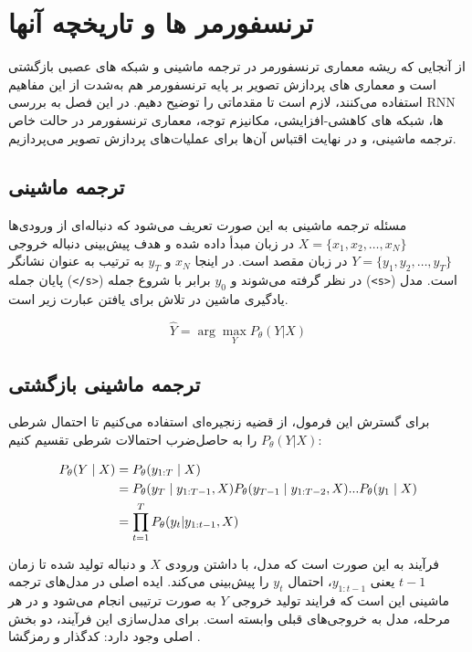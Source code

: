 \chapter{ترنسفورمر ها و تاریخچه آنها}

از آنجایی که ریشه معماری ترنسفورمر در ترجمه ماشینی و شبکه های عصبی بازگشتی است و معماری های پردازش تصویر بر پایه ترنسفورمر هم به‌شدت از این مفاهیم استفاده می‌کنند، لازم است تا مقدماتی را توضیح دهیم. در این فصل به بررسی RNN ها، شبکه های کاهشی-افزایشی، مکانیزم توجه، معماری ترنسفورمر در حالت خاص ترجمه ماشینی، و در نهایت اقتباس آن‌ها برای عملیات‌های پردازش تصویر می‌پردازیم.

\section{ ترجمه ماشینی}
مسئله ترجمه ماشینی به این صورت تعریف می‌شود که دنباله‌ای از ورودی‌ها $X = \{x_1, x_2, \dots, x_N\}$ در زبان مبدأ داده شده و هدف پیش‌بینی دنباله خروجی $Y = \{y_1, y_2, \dots, y_T\}$ در زبان مقصد است. در اینجا $x_N$ و $ y_T $ به ترتیب به عنوان نشانگر پایان جمله (\texttt{</s>}) در نظر گرفته می‌شوند و $ y_0 $
برابر با شروع جمله (\texttt{<s>}) است. مدل یادگیری ماشین در تلاش برای یافتن عبارت زیر است.

\begin{equation}
\hat{Y} = \arg\max_{Y} P_\theta(Y | X)
\end{equation}

\section{ ترجمه ماشینی بازگشتی}



برای گسترش این فرمول، از قضیه زنجیره‌ای استفاده می‌کنیم تا احتمال شرطی $P_\theta(Y|X)$ را به حاصل‌ضرب احتمالات شرطی تقسیم کنیم:

\begin{align}
	P_{\theta }(Y \mid X) & = P_{\theta }(y_{1:T} \mid X)  \notag \\
	& = P_{\theta }(y_{T} \mid y_{1:T-1}, X) 
	P_{\theta }(y_{T-1} \mid y_{1:T-2}, X)
	...
	P_{\theta }(y_{1} \mid X) \notag \\
	& = \prod_{t=1}^{T} P_\theta(y_t | y_{1:t-1}, X)
\end{align}

فرآیند به این صورت است که مدل، با داشتن ورودی $X$ و دنباله تولید شده تا زمان $t-1$ یعنی $y_{1:t-1}$، احتمال $y_t$ را پیش‌بینی می‌کند. ایده اصلی در مدل‌های ترجمه ماشینی این است که فرایند تولید خروجی $Y$ به صورت ترتیبی انجام می‌شود و در هر مرحله، مدل به خروجی‌های قبلی وابسته است.  برای مدل‌سازی این فرآیند، دو بخش اصلی وجود دارد: کدگذار  و رمزگشا .
